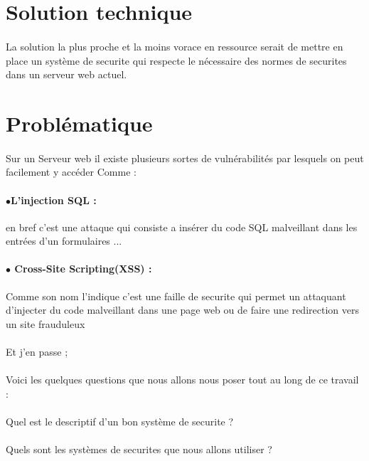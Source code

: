\documentclass{report}
\begin{document}
   \section{Solution technique} 
   \paragraph{ }
   La solution la plus proche et la moins vorace en ressource serait de mettre en place un système de securite qui respecte le nécessaire des normes de securites dans un serveur web actuel.
   \section{Problématique }
   \paragraph{ }
   Sur un Serveur web il existe plusieurs sortes de vulnérabilités par lesquels on peut facilement y accéder Comme : 
     \paragraph {$\bullet$L'injection SQL : }
      en bref c'est une attaque qui consiste a insérer du code SQL malveillant  dans les entrées   d'un formulaires ...
   
   \paragraph{$\bullet$ Cross-Site Scripting(XSS) :} Comme son nom l'indique c'est une faille de securite qui permet un attaquant d'injecter du code malveillant dans une page web ou de faire une redirection vers un site frauduleux 
   \paragraph{ }
   Et j'en passe ;
   \pagebreak
   \paragraph{ }
   Voici les  quelques questions que nous allons nous poser tout au long de ce travail :
   \paragraph{ }
   \textendash \space Quel est le descriptif d'un bon système de securite ?
   \paragraph{ }
   \textendash \space Quels sont les systèmes de securites  que nous allons utiliser ?
\end{document}
